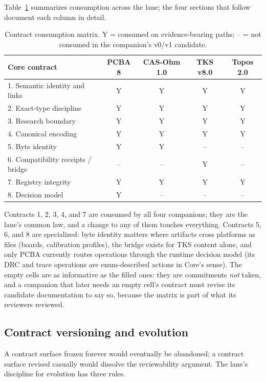 Table~\ref{integ:tab:matrix} summarizes consumption across the lane; the four sections that follow document each column in detail.

\begin{table}[htbp]
\centering
\caption{Contract consumption matrix. Y = consumed on evidence-bearing paths; -- = not consumed in the companion's v0/v1 candidate.}
\label{integ:tab:matrix}
\begin{tabular}{@{}lcccc@{}}
\toprule
Core contract & PCBA 8 & CAS-Ohm 1.0 & TKS v8.0 & Topos 2.0 \\
\midrule
1. Semantic identity and links & Y & Y & Y & Y \\
2. Exact-type discipline & Y & Y & Y & Y \\
3. Research boundary & Y & Y & Y & Y \\
4. Canonical encoding & Y & Y & Y & Y \\
5. Byte identity & Y & Y & -- & -- \\
6. Compatibility receipts / bridge & -- & -- & Y & -- \\
7. Registry integrity & Y & Y & Y & Y \\
8. Decision model & Y & -- & -- & -- \\
\bottomrule
\end{tabular}
\end{table}

Contracts 1, 2, 3, 4, and 7 are consumed by all four companions; they are the lane's common law, and a change to any of them touches everything. Contracts 5, 6, and 8 are specialized: byte identity matters where artifacts cross platforms as files (boards, calibration profiles), the bridge exists for TKS content alone, and only PCBA currently routes operations through the runtime decision model (its DRC and trace operations are enum-described actions in Core's sense). The empty cells are as informative as the filled ones: they are commitments \emph{not} taken, and a companion that later needs an empty cell's contract must revise its candidate documentation to say so, because the matrix is part of what its reviewers reviewed.

\subsection{Contract versioning and evolution}\label{integ:versioning}

A contract surface frozen forever would eventually be abandoned; a contract surface revised casually would dissolve the reviewability argument. The lane's discipline for evolution has three rules.

